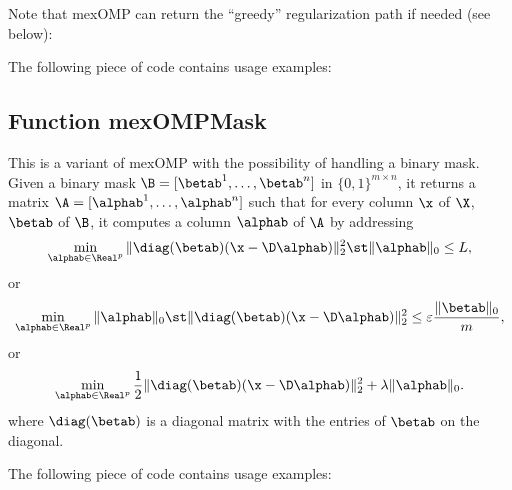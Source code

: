 \documentclass[a4paper, 11pt]{article}
\begin{document}
     Note that mexOMP can return the ``greedy'' regularization path if needed (see below):
%    

The following piece of code contains usage examples:



\subsection{Function mexOMPMask}
This is a variant of mexOMP with the possibility of handling a binary mask. 
Given a binary mask $\B=[\betab^1,\ldots,\betab^n]$ in $\{0,1\}^{m \times n}$, it returns a matrix $\A=[\alphab^1,\ldots,\alphab^n]$ such that for every column $\x$ of $\X$, $\betab$ of $\B$, it computes a column $\alphab$ of $\A$ by addressing
\begin{equation}
\min_{\alphab \in \Real^p} \|\diag(\betab)(\x-\D\alphab)\|_2^2 \st \|\alphab\|_0 \leq L,
   \end{equation}
   or 
   \begin{equation}
   \min_{\alphab \in \Real^p}  \|\alphab\|_0 \st \|\diag(\betab)(\x-\D\alphab)\|_2^2 \leq \varepsilon\frac{\|\betab\|_0}{m},
   \end{equation}
   or
   \begin{equation}
   \min_{\alphab \in \Real^p} \frac{1}{2}\|\diag(\betab)(\x-\D\alphab)\|_2^2 +\lambda\|\alphab\|_0.
   \end{equation}
   where $\diag(\betab)$ is a diagonal matrix with the entries of $\betab$ on the diagonal.

%    

The following piece of code contains usage examples:

\end{document}
